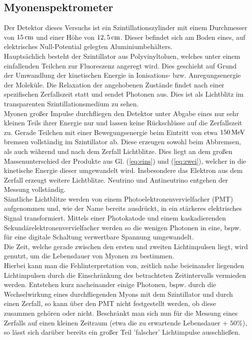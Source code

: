 \documentclass[numbers=noenddot,12pt,a4paper]{scrartcl}
\begin{document}
\subsection{Myonenspektrometer}
Der Detektor dieses Versuchs ist ein Szintillationszylinder mit einem Durchmesser von $\unit[15]{cm}$ und einer Höhe von $\unit[12,5]{cm}$. Dieser befindet sich am Boden eines, auf elektrisches Null-Potential gelegten Aluminiumbehälters.\\
Hauptsächlich besteht der Szintillator aus Polyvinyltoluen, welches unter einem einfallenden Teilchen zur Fluoreszenz angeregt wird. Dies geschieht auf Grund der Umwandlung der kinetischen Energie in Ionisations- bzw. Anregungsenergie der Moleküle. Die Relaxation der angehobenen Zustände findet nach einer spezifischen Zerfallszeit statt und sendet Photonen aus. Dies ist als Lichtblitz im transparenten Szintillationsmedium zu sehen.\\
Myonen großer Impulse durchfliegen den Detektor unter Abgabe eines nur sehr kleinen Teils ihrer Energie nur und lassen keine Rückschlüsse auf die Zerfallszeit zu. Gerade Teilchen mit einer Bewegungsenergie beim Eintritt von etwa $\unit[150]{MeV}$ bremsen vollständig im Szintillator ab. Diese erzeugen sowohl beim Abbremsen, als auch während und nach dem Zerfall Lichtblitze. Dies liegt an dem großen Massenunterschied der Produkte aus Gl. (\ref{eq:eins}) und (\ref{eq:zwei}), welcher in die kinetische Energie dieser umgewandelt wird. Insbesondere das Elektron aus dem Zerfall erzeugt weitere Lichtblitze. Neutrino und Antineutrino entgehen der Messung vollständig.\\
Sämtliche Lichtblitze werden von einem Photoelektronenvervielfacher (PMT) aufgenommen und, wie der Name bereits ausdrückt, in ein stärkeres elektrisches Signal transformiert. Mittels einer Photokatode und einem kaskadierenden Sekundärelektronenvervielfacher werden so die wenigen Photonen in eine, bspw. für eine digitale Schaltung verwertbare Spannung umgewandelt.\\
Die Zeit, welche gerade zwischen den ersten und zweiten Lichtimpulsen liegt, wird genutzt, um die Lebensdauer von Myonen zu bestimmen.\\
Hierbei kann man die Fehlinterpretation von, zeitlich nahe beieinander liegenden Lichtimpulsen durch die Einschränkung des betrachteten Zeitintervalls vermieden werden. Entstehen kurz nacheinander einige Photonen, bspw. durch die Wechselwirkung eines durchfliegenden Myons mit dem Szintillator und durch einen Zerfall, so kann über den PMT nicht festgestellt werden, ob diese zusammen gehören oder nicht. Beschränkt man sich nun für die Messung eines Zerfalls auf einen kleinen Zeitraum (etwa die zu erwartende Lebensdauer + $50\%$), so lässt sich darüber bereits ein großer Teil 'falscher' Lichtimpulse ausschließen.\\
\end{document}
